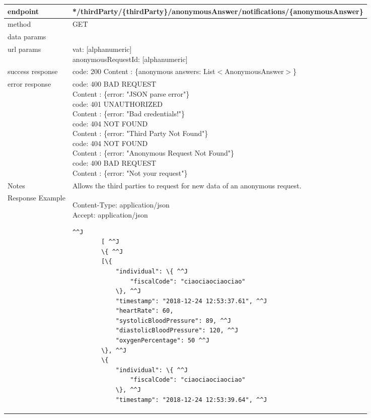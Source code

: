 	\begin{tabularx}{\linewidth}{| l| l }
		\hline
		endpoint & */thirdParty/\{thirdParty\}/anonymousAnswer/notifications/\{anonymousAnswer\} \\
		\hline
		method & GET \\
		\hline
		data params & \\
		\hline
		url params &
		\parbox{0.7\textwidth}{
			\bigskip
			vat: [alphanumeric]\\
			anonymousRequestId: [alphanumeric]
			\bigskip
		} \\
		\hline
		success response &
		\parbox{0.7\textwidth}{
			\bigskip
			code: 200\\
			Content : \{anonymous answers: List$<$AnonymousAnswer$>$\}
			\bigskip
		} \\
		\hline
		error response &
		\parbox{0.7\textwidth}{
			\bigskip
			code: 400 BAD REQUEST \\
			Content : \{error: "JSON parse error"\}\\
			code: 401 UNAUTHORIZED \\
			Content : \{error: "Bad credentials!"\}\\
			code: 404 NOT FOUND \\
			Content : \{error: "Third Party Not Found"\}\\
			code: 404 NOT FOUND \\
			Content : \{error: "Anonymous Request Not Found"\}\\
			code: 400 BAD REQUEST \\
			Content : \{error: "Not your request"\}\\
			\bigskip
		} \\
		\hline
		Notes & 
		\parbox{0.7\textwidth}{
			\bigskip Allows the third parties to request for new data of an anonymous request.
		\bigskip}  \\
		\hline
		Response Example & 
		\parbox{0.8\textwidth}{
		\bigskip
		Content-Type: application/json \\
		Accept: application/json \\
		\bigskip
		\begin{lstlisting}^^J
		[ ^^J
		\{ ^^J
		[\{
			"individual": \{ ^^J
				"fiscalCode": "ciaociaociaociao"
			\}, ^^J
			"timestamp": "2018-12-24 12:53:37.61", ^^J
			"heartRate": 60,
			"systolicBloodPressure": 89, ^^J
			"diastolicBloodPressure": 120, ^^J
			"oxygenPercentage": 50 ^^J
		\}, ^^J
		\{
			"individual": \{ ^^J
				"fiscalCode": "ciaociaociaociao"
			\}, ^^J
			"timestamp": "2018-12-24 12:53:39.64", ^^J

\end{lstlisting}}
\end{tabularx}
